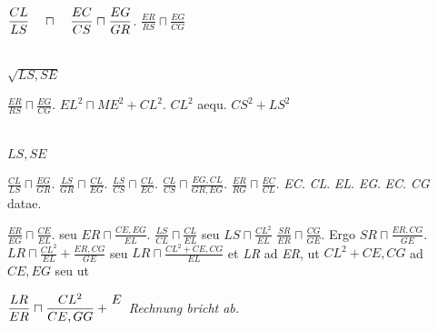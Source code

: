 \pend
\pstart
\hspace*{3mm}\rule[-3mm]{0pt}{9mm}$\displaystyle\frac{CL}{LS} \hspace{3.5mm} \sqcap \hspace{3.5mm} \displaystyle\frac{EC}{CS}\sqcap \frac{EG}{GR}$.\quad 
$\displaystyle\frac{ER}{RS}\sqcap\frac{EG}{CG}$
\pend
\pstart
\parbox{4cm}{%
\hspace*{17mm}
\\[-.5ex]
\hspace*{15mm}$\sqrt{LS,SE}$}
\pend
\pstart
\rule[-6mm]{0pt}{12mm}$\displaystyle\frac{ER}{RS}\sqcap\frac{EG}{CG}$.\quad
$EL^2\sqcap ME^2+CL^2$. 
\pend
\pstart
$CL^2$ 
\ledpb%
aequ. $CS^2+LS^2$
\pend
\pstart
\parbox{4cm}{%
\hspace*{12mm}
\\[-.5ex]
\hspace*{11.5mm}$LS,SE$}
\pend
\pstart
\rule[-5mm]{0pt}{10mm}%
$\displaystyle\frac{CL}{LS}\sqcap\frac{EG}{GR}$.\quad
$\displaystyle\frac{LS}{GR}\sqcap\frac{CL}{EG}$.\quad 
$\displaystyle\frac{LS}{CS}\sqcap\frac{CL}{EC}$. \qquad
$\displaystyle\frac{CL}{CS}\sqcap\frac{EG,CL}{GR,EG}$.\quad 
$\displaystyle\frac{ER}{RG}\sqcap\frac{EC}{CL}$.
\pend
\pstart
\textit{EC}. \textit{CL}. \textit{EL}. \textit{EG}. \textit{EC}. \textit{CG} datae.
\pend
\pstart
\rule[-4mm]{0pt}{11mm}%
$\displaystyle\frac{ER}{EG}\sqcap\frac{CE}{EL}$. seu $ER\sqcap\displaystyle\frac{CE,EG}{EL}$.\quad
$\displaystyle\frac{LS}{CL}\sqcap\frac{CL}{EL}$ seu $LS\sqcap\displaystyle\frac{CL^2}{EL}$
\pend
\pstart
$\displaystyle\frac{SR}{ER}\sqcap\frac{CG}{GE}$. Ergo $SR\sqcap\displaystyle\frac{ER,CG}{GE}$. 
$LR \sqcap\displaystyle\frac{CL^2}{EL}+\displaystyle\frac{ER,CG}{GE}$ seu $LR \sqcap\displaystyle\frac{CL^2+CE,CG}{EL}$ et \textit{LR} ad \textit{ER}, ut $CL^2+CE,CG$ ad $CE,EG$ seu ut 
\rule[-2mm]{0pt}{9mm}%
$\displaystyle\frac{LR}{ER}\sqcap\frac{CL^2}{CE,GG}+\efrac{E}{}$ \lbrack\textit{Rechnung bricht ab.}\rbrack\
\pend
\normalsize %
\vspace{0.5em} %
\pstart
{}%
